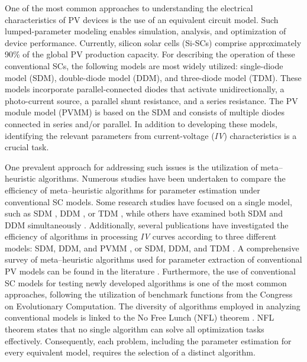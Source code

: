 \documentclass[a4paper,fleqn]{cas-sc}
\begin{document}
One of the most common approaches to understanding the electrical characteristics of PV devices is the use of an equivalent circuit model.
Such lumped-parameter modeling enables simulation, analysis, and optimization of device performance.
Currently, silicon solar cells (Si-SCs) comprise approximately 90\% of the global PV production capacity.
For describing the operation of these conventional SCs, the following models are most widely utilized:
single-diode model (SDM), double-diode model (DDM), and three-diode model (TDM).
These models incorporate
parallel-connected diodes that activate unidirectionally,
a photo-current source, a parallel shunt resistance, and a series resistance.
The PV module model (PVMM) is based on the SDM and consists of multiple diodes connected in series and/or parallel.
In addition to developing these models, identifying the relevant parameters from current-voltage (\emph{IV}) characteristics is a crucial task.

One prevalent approach for addressing such issues is the utilization of meta--heuristic algorithms.
Numerous studies have been undertaken to compare the efficiency of meta--heuristic algorithms for parameter estimation under conventional SC models.
Some research studies have focused on a single model, such as SDM \cite{DE_EM}, DDM \cite{SSA,FWA}, or TDM \cite{ELSHADE_INR},
while others have examined both SDM and DDM simultaneously \cite{ELPSO,Barth2016,BPFPA,MPALW}.
Additionally, several publications have investigated the efficiency of algorithms in processing \emph{IV} curves
according to three different models:
SDM, DDM, and PVMM \cite{IMPA,SCA_NM_OBL,HFAPS,IWOA}, or SDM, DDM, and TDM \cite{Kepler}.
A comprehensive survey of meta--heuristic algorithms used for parameter extraction
of conventional PV models can be found in the literature \cite{Li2021,Yang2020}.
Furthermore, the use of conventional SC models for testing newly developed algorithms
is one of the most common approaches, following the utilization of benchmark functions from the Congress on Evolutionary Computation.
The diversity of algorithms employed in analyzing conventional models is linked to the No Free Lunch (NFL) theorem \cite{NFL}.
NFL theorem states that no single algorithm can solve all optimization tasks effectively.
Consequently, each problem, including the parameter estimation for every equivalent model, requires the selection of a distinct algorithm.
\end{document}
